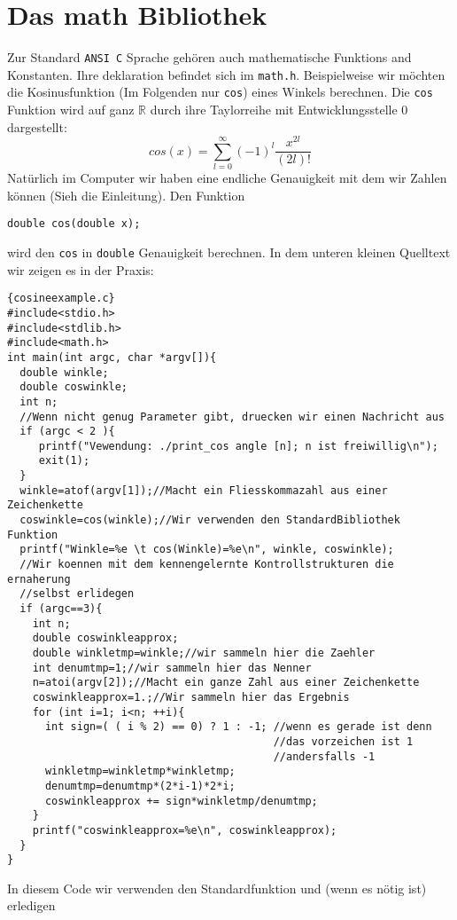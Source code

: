 \section{Das math Bibliothek}
Zur Standard \texttt{ANSI C} Sprache gehören auch mathematische Funktions and Konstanten.
Ihre deklaration befindet sich im \texttt{math.h}. Beispielweise wir möchten 
die Kosinusfunktion (Im Folgenden nur \texttt{cos}) eines Winkels berechnen.
Die \texttt{cos} Funktion wird auf ganz $\mathbb{R}$ durch ihre 
Taylorreihe mit Entwicklungsstelle 0 dargestellt:
\begin{equation}
cos\left(x\right)=\sum_{l=0}^{\infty} \left(-1\right)^{l} \dfrac{x^{2l}}{\left(2l\right)!}
\end{equation}
Natürlich im Computer wir haben eine endliche Genauigkeit mit dem wir Zahlen können
(Sieh die Einleitung). Den Funktion 
\begin{lstlisting}
double cos(double x);
\end{lstlisting}
wird den \texttt{cos} in \texttt{double} Genauigkeit berechnen.
In dem unteren kleinen Quelltext wir zeigen es in der Praxis:
\begin{lstlisting}{cosineexample.c}
#include<stdio.h>
#include<stdlib.h>
#include<math.h>
int main(int argc, char *argv[]){
  double winkle;
  double coswinkle;
  int n;
  //Wenn nicht genug Parameter gibt, druecken wir einen Nachricht aus
  if (argc < 2 ){
     printf("Vewendung: ./print_cos angle [n]; n ist freiwillig\n");
     exit(1);
  }
  winkle=atof(argv[1]);//Macht ein Fliesskommazahl aus einer Zeichenkette
  coswinkle=cos(winkle);//Wir verwenden den StandardBibliothek Funktion
  printf("Winkle=%e \t cos(Winkle)=%e\n", winkle, coswinkle);
  //Wir koennen mit dem kennengelernte Kontrollstrukturen die ernaherung
  //selbst erlidegen
  if (argc==3){
    int n;
    double coswinkleapprox;
    double winkletmp=winkle;//wir sammeln hier die Zaehler
    int denumtmp=1;//wir sammeln hier das Nenner
    n=atoi(argv[2]);//Macht ein ganze Zahl aus einer Zeichenkette
    coswinkleapprox=1.;//Wir sammeln hier das Ergebnis
    for (int i=1; i<n; ++i){
      int sign=( ( i % 2) == 0) ? 1 : -1; //wenn es gerade ist denn
                                          //das vorzeichen ist 1
                                          //andersfalls -1
      winkletmp=winkletmp*winkletmp;
      denumtmp=denumtmp*(2*i-1)*2*i;
      coswinkleapprox += sign*winkletmp/denumtmp;
    }
    printf("coswinkleapprox=%e\n", coswinkleapprox);
  }
}
\end{lstlisting}
In diesem Code wir verwenden den Standardfunktion und (wenn es nötig ist) erledigen

